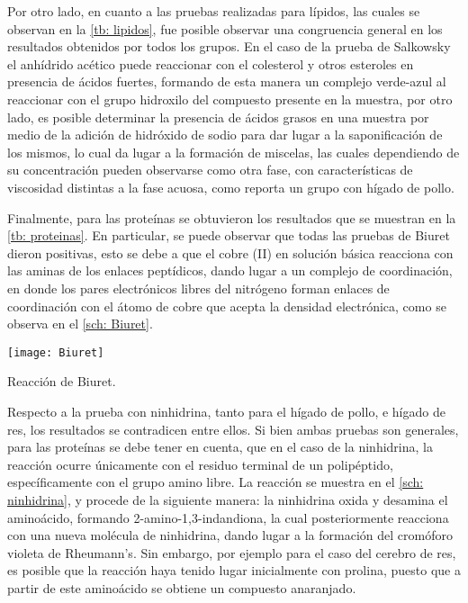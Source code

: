 \documentclass[fleqn,10pt]{SelfArx}
\begin{document}
	\pagebreak
	
	Por otro lado, en cuanto a las pruebas realizadas para lípidos, las cuales se observan en la \autoref{tb: lipidos}, fue posible observar una congruencia general en los resultados obtenidos por todos los grupos. En el caso de la prueba de Salkowsky el anhídrido acético puede reaccionar con el colesterol y otros esteroles en presencia de ácidos fuertes, formando de esta manera un complejo verde-azul al reaccionar con el grupo hidroxilo del compuesto presente en la muestra, por otro lado, es posible determinar la presencia de \'acidos grasos en una muestra por medio de la adición de hidróxido de sodio para dar lugar a la saponificaci\'on de los mismos, lo cual da lugar a la formaci\'on de miscelas, las cuales dependiendo de su concentraci\'on pueden observarse como otra fase, con caracter\'isticas de viscosidad distintas a la fase acuosa, como reporta un grupo con h\'igado de pollo.
	
	
	
	\pagebreak
	Finalmente, para las prote\'inas se obtuvieron los resultados que se muestran en la \autoref{tb: proteinas}. En particular, se puede observar que todas las pruebas de Biuret dieron positivas, esto se debe a que el cobre (II) en soluci\'on b\'asica reacciona con las aminas de los enlaces pept\'idicos, dando lugar a un complejo de coordinaci\'on, en donde los pares electr\'onicos libres del nitr\'ogeno forman enlaces de coordinaci\'on con el \'atomo de cobre que acepta la densidad electr\'onica, como se observa en el \autoref{sch: Biuret}. 
	
	\begin{scheme}[h]
		\centering
		\texttt{[image: Biuret]}
		\caption{Reacci\'on de Biuret.}
		\label{sch: Biuret}
	\end{scheme}

	Respecto a la prueba con ninhidrina, tanto para el h\'igado de pollo, e h\'igado de res, los resultados se contradicen entre ellos. Si bien ambas pruebas son generales, para las prote\'inas se debe tener en cuenta, que en el caso de la ninhidrina, la reacci\'on ocurre \'unicamente con el residuo terminal de un polip\'eptido, espec\'ificamente con el grupo amino libre. La reacci\'on se muestra en el \autoref{sch: ninhidrina}, y procede de la siguiente manera: la ninhidrina oxida y desamina el amino\'acido, formando 2-amino-1,3-indandiona, la cual posteriormente reacciona con una nueva mol\'ecula de ninhidrina, dando lugar a la formaci\'on del crom\'oforo violeta de Rheumann's. Sin embargo, por ejemplo para el caso del cerebro de res, es posible que la reacci\'on haya tenido lugar inicialmente con prolina, puesto que a partir de este amino\'acido se obtiene un compuesto anaranjado.
	
\end{document}
